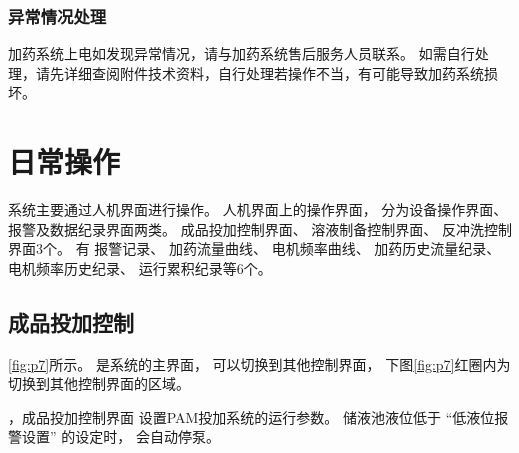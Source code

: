 \documentclass[UTF8,a4paper,12pt,titlepage]{ctexart}
\begin{document}
      \subsubsection{异常情况处理}
      加药系统上电如发现异常情况，请与加药系统售后服务人员联系。
      如需自行处理，请先详细查阅附件技术资料，自行处理若操作不当，有可能导致加药系统损坏。

\newpage %

\section{日常操作}\label{sec:sg3}
   系统主要通过人机界面进行操作。
      人机界面上的操作界面，
      分为设备操作界面、报警及数据纪录界面两类。
      成品投加控制界面、
      溶液制备控制界面、
      反冲洗控制界面3个。
       有
      报警记录、
      加药流量曲线、
      电机频率曲线、
      加药历史流量纪录、
      电机频率历史纪录、
      运行累积纪录等6个。

   \subsection{成品投加控制}

      \ref{fig:p7}所示。
      是系统的主界面，
      可以切换到其他控制界面，
      下图\ref{fig:p7}红圈内为切换到其他控制界面的区域。

        

      ，成品投加控制界面
      设置PAM投加系统的运行参数。
            储液池液位低于
            “低液位报警设置”
            的设定时，
            会自动停泵。
\end{document}
